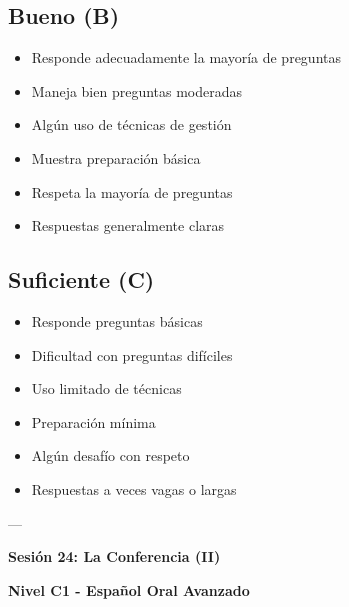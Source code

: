 \documentclass[a4paper,11pt]{article}
\begin{document}
\vspace{0.2cm}

\subsection{Bueno (B)}

\begin{itemize}

  \item Responde adecuadamente la mayoría de preguntas

  \item Maneja bien preguntas moderadas

  \item Algún uso de técnicas de gestión

  \item Muestra preparación básica

  \item Respeta la mayoría de preguntas

  \item Respuestas generalmente claras

\end{itemize}

\vspace{0.2cm}

\subsection{Suficiente (C)}

\begin{itemize}

  \item Responde preguntas básicas

  \item Dificultad con preguntas difíciles

  \item Uso limitado de técnicas

  \item Preparación mínima

  \item Algún desafío con respeto

  \item Respuestas a veces vagas o largas

\end{itemize}

\vspace{0.2cm}

---

\vspace{0.2cm}

\textbf{Sesión 24: La Conferencia (II)}

\textbf{Nivel C1 - Español Oral Avanzado}

\vspace{0.2cm}
\end{document}
